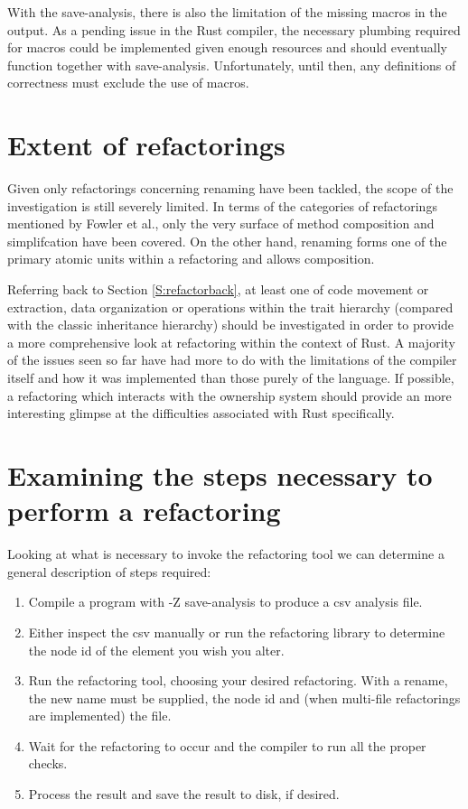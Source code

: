 With the save-analysis, there is also the limitation of the missing macros in the output. As a pending issue in the Rust compiler, the necessary plumbing required for macros could be implemented given enough resources and should eventually function together with save-analysis. Unfortunately, until then, any definitions of correctness must exclude the use of macros. 

\section{Extent of refactorings}
Given only refactorings concerning renaming have been tackled, the scope of the investigation is still severely limited. In terms of the categories of refactorings mentioned by Fowler et al., only the very surface of method composition and simplifcation have been covered. On the other hand, renaming forms one of the primary atomic units within a refactoring and allows composition.

Referring back to Section \ref{S:refactorback}, at least one of code movement or extraction, data organization or operations within the trait hierarchy (compared with the classic inheritance hierarchy) should be investigated in order to provide a more comprehensive look at refactoring within the context of Rust. A majority of the issues seen so far have had more to do with the limitations of the compiler itself and how it was implemented than those purely of the language. If possible, a refactoring which interacts with the ownership system should provide an more interesting glimpse at the difficulties associated with Rust specifically.

\section{Examining the steps necessary to perform a refactoring}

Looking at what is necessary to invoke the refactoring tool we can determine a general description of steps required:

\begin{enumerate}
\item Compile a program with -Z save-analysis to produce a csv analysis file.
\item Either inspect the csv manually or run the refactoring library to determine the node id of the element you wish you alter.
\item Run the refactoring tool, choosing your desired refactoring. With a rename, the new name must be supplied, the node id and (when multi-file refactorings are implemented) the file.
\item Wait for the refactoring to occur and the compiler to run all the proper checks. 
\item Process the result and save the result to disk, if desired.
\end{enumerate}

